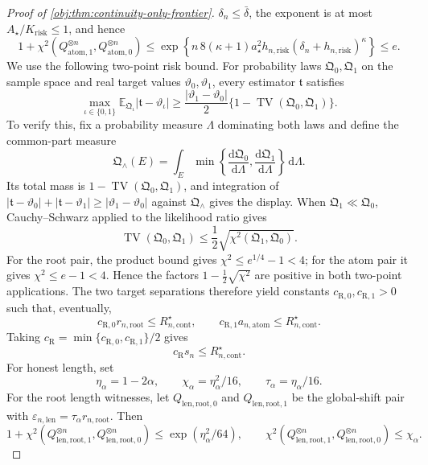 \documentclass[11pt]{article}
\begin{document}
\begin{proof}[Proof of \cref{obj:thm:continuity-only-frontier}]
\(\delta_n\leq\bar\delta\), the exponent is at most \(A_\star/K_{\mathrm{risk}}\leq1\), and hence
\[
1+\chi^2(Q_{\mathrm{atom},1}^{\otimes n},Q_{\mathrm{atom},0}^{\otimes n})
\leq
\exp\!\left\{n\,8(\kappa+1)a_\star^2h_{n,\mathrm{risk}}
(\delta_n+h_{n,\mathrm{risk}})^\kappa\right\}
\leq e .
\]
We use the following two-point risk bound.  For probability laws
\(\mathfrak Q_0,\mathfrak Q_1\) on the sample space and real target values
\(\vartheta_0,\vartheta_1\), every estimator \(\mathfrak t\) satisfies
\[
\max_{\iota\in\{0,1\}}
\mathbb E_{\mathfrak Q_\iota}|\mathfrak t-\vartheta_\iota|
\geq
\frac{|\vartheta_1-\vartheta_0|}{2}
\{1-\operatorname{TV}(\mathfrak Q_0,\mathfrak Q_1)\}.
\]
To verify this, fix a probability measure \(\Lambda\) dominating both laws and define the common-part measure
\[
\mathfrak Q_\wedge(E)=
\int_E
\min\left\{\frac{\mathrm d\mathfrak Q_0}{\mathrm d\Lambda},
          \frac{\mathrm d\mathfrak Q_1}{\mathrm d\Lambda}\right\}
\,\mathrm d\Lambda .
\]
Its total mass is \(1-\operatorname{TV}(\mathfrak Q_0,\mathfrak Q_1)\), and integration of
\(|\mathfrak t-\vartheta_0|+|\mathfrak t-\vartheta_1|\geq
|\vartheta_1-\vartheta_0|\) against \(\mathfrak Q_\wedge\) gives the display.  When
\(\mathfrak Q_1\ll\mathfrak Q_0\), Cauchy--Schwarz applied to the likelihood ratio gives
\[
\operatorname{TV}(\mathfrak Q_0,\mathfrak Q_1)
\leq \frac12\sqrt{\chi^2(\mathfrak Q_1,\mathfrak Q_0)}.
\]
For the root pair, the product bound gives \(\chi^2\leq e^{1/4}-1<4\); for the atom pair it gives
\(\chi^2\leq e-1<4\).  Hence the factors
\(1-\frac12\sqrt{\chi^2}\) are positive in both two-point applications.  The two target separations therefore yield constants
\(c_{\mathrm R,0},c_{\mathrm R,1}>0\) such that, eventually,
\[
c_{\mathrm R,0}r_{n,\mathrm{root}}\leq R_{n,\mathrm{cont}}^\star,
\qquad
c_{\mathrm R,1}a_{n,\mathrm{atom}}\leq R_{n,\mathrm{cont}}^\star .
\]
Taking \(c_{\mathrm R}=\min\{c_{\mathrm R,0},c_{\mathrm R,1}\}/2\) gives
\[
c_{\mathrm R}s_n\leq R_{n,\mathrm{cont}}^\star .
\]
For honest length, set
\[
\eta_\alpha=1-2\alpha,
\qquad
\chi_\alpha=\eta_\alpha^2/16,
\qquad
\tau_\alpha=\eta_\alpha/16 .
\]
For the root length witnesses, let
\(Q_{\mathrm{len},\mathrm{root},0}\) and \(Q_{\mathrm{len},\mathrm{root},1}\) be the global-shift pair with
\(\varepsilon_{n,\mathrm{len}}=\tau_\alpha r_{n,\mathrm{root}}\).  Then
\[
1+\chi^2(Q_{\mathrm{len},\mathrm{root},1}^{\otimes n},
Q_{\mathrm{len},\mathrm{root},0}^{\otimes n})
\leq
\exp(\eta_\alpha^2/64),
\qquad
\chi^2(Q_{\mathrm{len},\mathrm{root},1}^{\otimes n},
Q_{\mathrm{len},\mathrm{root},0}^{\otimes n})\leq \chi_\alpha .
\]
\end{proof}
\end{document}
